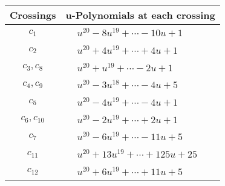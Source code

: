 \documentclass[1p]{elsarticle_modified}
\theoremstyle{definition}
\begin{document}
\begin{tabular}{m{50pt}|m{274pt}}
Crossings & \hspace{64pt}u-Polynomials at each crossing \\
\hline $$\begin{aligned}c_{1}\end{aligned}$$&$\begin{aligned}
&u^{20}-8 u^{19}+\cdots-10 u+1
\end{aligned}$\\
\hline $$\begin{aligned}c_{2}\end{aligned}$$&$\begin{aligned}
&u^{20}+4 u^{19}+\cdots+4 u+1
\end{aligned}$\\
\hline $$\begin{aligned}c_{3},c_{8}\end{aligned}$$&$\begin{aligned}
&u^{20}+u^{19}+\cdots-2 u+1
\end{aligned}$\\
\hline $$\begin{aligned}c_{4},c_{9}\end{aligned}$$&$\begin{aligned}
&u^{20}-3 u^{18}+\cdots-4 u+5
\end{aligned}$\\
\hline $$\begin{aligned}c_{5}\end{aligned}$$&$\begin{aligned}
&u^{20}-4 u^{19}+\cdots-4 u+1
\end{aligned}$\\
\hline $$\begin{aligned}c_{6},c_{10}\end{aligned}$$&$\begin{aligned}
&u^{20}-2 u^{19}+\cdots+2 u+1
\end{aligned}$\\
\hline $$\begin{aligned}c_{7}\end{aligned}$$&$\begin{aligned}
&u^{20}-6 u^{19}+\cdots-11 u+5
\end{aligned}$\\
\hline $$\begin{aligned}c_{11}\end{aligned}$$&$\begin{aligned}
&u^{20}+13 u^{19}+\cdots+125 u+25
\end{aligned}$\\
\hline $$\begin{aligned}c_{12}\end{aligned}$$&$\begin{aligned}
&u^{20}+6 u^{19}+\cdots+11 u+5
\end{aligned}$\\
\hline
\end{tabular}\\~\\
\end{document}
